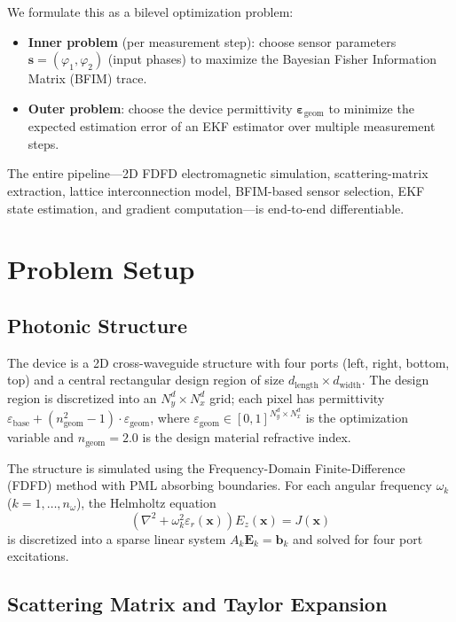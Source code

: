 \documentclass[11pt,a4paper]{article}
\begin{document}
We formulate this as a bilevel optimization problem:
\begin{itemize}[nosep]
  \item \textbf{Inner problem} (per measurement step): choose sensor parameters $\bm{s} = (\varphi_1, \varphi_2)$ (input phases) to maximize the Bayesian Fisher Information Matrix (BFIM) trace.
  \item \textbf{Outer problem}: choose the device permittivity $\bm{\varepsilon}_{\text{geom}}$ to minimize the expected estimation error of an EKF estimator over multiple measurement steps.
\end{itemize}

The entire pipeline---2D FDFD electromagnetic simulation, scattering-matrix extraction, lattice interconnection model, BFIM-based sensor selection, EKF state estimation, and gradient computation---is end-to-end differentiable.

\section{Problem Setup}

\subsection{Photonic Structure}

The device is a 2D cross-waveguide structure with four ports (left, right, bottom, top) and a central rectangular design region of size $d_{\text{length}} \times d_{\text{width}}$.  The design region is discretized into an $N_y^d \times N_x^d$ grid; each pixel has permittivity $\varepsilon_{\text{base}} + (n_{\text{geom}}^2 - 1) \cdot \varepsilon_{\text{geom}}$, where $\varepsilon_{\text{geom}} \in [0,1]^{N_y^d \times N_x^d}$ is the optimization variable and $n_{\text{geom}} = 2.0$ is the design material refractive index.

The structure is simulated using the Frequency-Domain Finite-Difference (FDFD) method with PML absorbing boundaries.  For each angular frequency $\omega_k$ ($k = 1, \ldots, n_\omega$), the Helmholtz equation
\[
  (\nabla^2 + \omega_k^2 \varepsilon_r(\bm{x})) E_z(\bm{x}) = J(\bm{x})
\]
is discretized into a sparse linear system $A_k \bm{E}_k = \bm{b}_k$ and solved for four port excitations.

\subsection{Scattering Matrix and Taylor Expansion}
\end{document}
